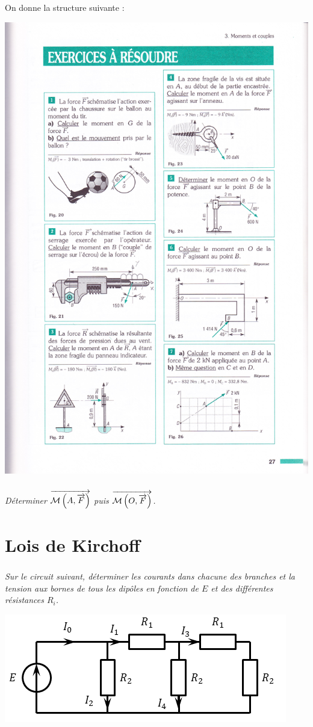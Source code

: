 \documentclass[10pt,fleqn]{article} %
\begin{document}
\begin{multicols}{2}
On donne la structure suivante : 
\begin{center}
\includegraphics[width=.6\linewidth]{images/fig_25}
\end{center}


\subparagraph{}
\textit{Déterminer $\overrightarrow{\mathcal{M}\left(A,\overrightarrow{F} \right)}$ puis $\overrightarrow{\mathcal{M}\left(O,\overrightarrow{F} \right)}$.}

\section*{Lois de Kirchoff}
\setcounter{exo}{0}


\subparagraph*{}
\textit{Sur le circuit suivant, déterminer les courants dans chacune des branches et la tension aux bornes de tous les dipôles en fonction de $E$ et des différentes résistances $R_i$.}
\begin{center}
\includegraphics[width=\linewidth]{images/fig_03}
\end{center}



\end{multicols}
\end{document}
